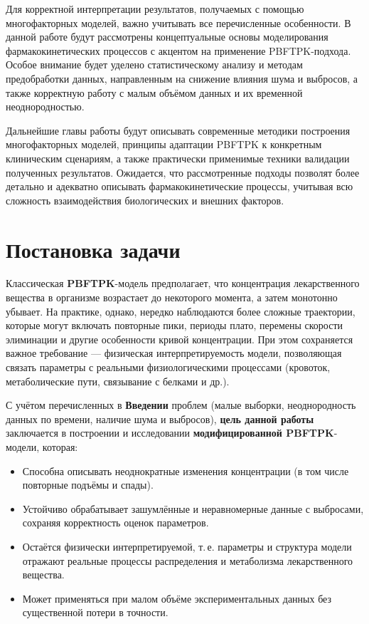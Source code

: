 \documentclass[12pt]{article}
\begin{document}
Для корректной интерпретации результатов, получаемых с помощью многофакторных моделей, важно учитывать все перечисленные особенности. В данной работе будут рассмотрены концептуальные основы моделирования фармакокинетических процессов с акцентом на применение PBFTPK-подхода. Особое внимание будет уделено статистическому анализу и методам предобработки данных, направленным на снижение влияния шума и выбросов, а также корректную работу с малым объёмом данных и их временной неоднородностью.

Дальнейшие главы работы будут описывать современные методики построения многофакторных моделей, принципы адаптации PBFTPK к конкретным клиническим сценариям, а также практически применимые техники валидации полученных результатов. Ожидается, что рассмотренные подходы позволят более детально и адекватно описывать фармакокинетические процессы, учитывая всю сложность взаимодействия биологических и внешних факторов.

\newpage

\section{Постановка задачи}


Классическая \textbf{PBFTPK}-модель предполагает, что концентрация лекарственного вещества в организме возрастает до некоторого момента, а затем монотонно убывает. На практике, однако, нередко наблюдаются более сложные траектории, которые могут включать повторные пики, периоды плато, перемены скорости элиминации и другие особенности кривой концентрации. При этом сохраняется важное требование --- физическая интерпретируемость модели, позволяющая связать параметры с реальными физиологическими процессами (кровоток, метаболические пути, связывание с белками и др.).

С учётом перечисленных в \textbf{Введении} проблем (малые выборки, неоднородность данных по времени, наличие шума и выбросов), \textbf{цель данной работы} заключается в построении и исследовании \textbf{модифицированной PBFTPK}-модели, которая:

\begin{itemize}
	\item Способна описывать неоднократные изменения концентрации (в том числе повторные подъёмы и спады).
	\item Устойчиво обрабатывает зашумлённые и неравномерные данные с выбросами, сохраняя корректность оценок параметров.
	\item Остаётся физически интерпретируемой, т.\,е. параметры и структура модели отражают реальные процессы распределения и метаболизма лекарственного вещества.
	\item Может применяться при малом объёме экспериментальных данных без существенной потери в точности.
\end{itemize}
\end{document}
